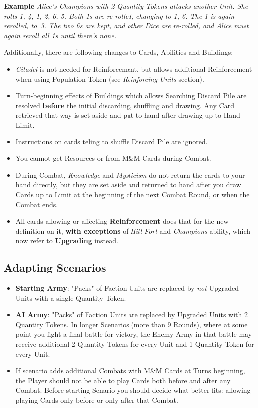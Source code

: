 \begin{multicols*}{2}
    \textbf{Example} \textit{Alice's Champions with 2 Quantity Tokens attacks another Unit. She rolls 1, 4, 1, 2, 6, 5. Both 1s are re-rolled, changing to 1, 6. The 1 is again rerolled, to~3. The two 6s are kept, and other Dice are re-rolled, and Alice must again reroll all 1s until there's none.}
    
    Additionally, there are following changes to Cards, Abilities and Buildings:
    \begin{itemize}
        \item \textit{Citadel} is not needed for Reinforcement, but allows additional Reinforcement when using Population Token (see \textit{Reinforcing Units} section).
        \item Turn-beginning effects of Buildings which allows Searching Discard Pile are resolved \textbf{before} the initial discarding, shuffling and drawing. Any Card retrieved that way is set aside and put to hand after drawing up to Hand Limit.
        \item Instructions on cards teling to shuffle Discard Pile are ignored.
        \item You cannot get Resources or  from M\&M Cards during Combat.
        \item During Combat, \textit{Knowledge} and \textit{Mysticism} do not return the cards to your hand directly, but they are set aside and returned to hand after you draw Cards up to Limit at the beginning of the next Combat Round, or when the Combat ends.
        \item All cards allowing or affecting \textbf{Reinforcement} does that for the new definition on it, \textbf{with exceptions} of \textit{Hill Fort} and \textit{Champions} ability, which now refer to \textbf{Upgrading} instead.
    \end{itemize}
    
    \subsection*{Adapting Scenarios}
    
    \begin{itemize}
        \item \textbf{Starting Army}: "Packs" of Faction Units are replaced by \textit{not} Upgraded Units with a single Quantity Token.
        \item \textbf{AI Army}: "Packs" of Faction Units are replaced by Upgraded Units with 2 Quantity Tokens. In longer Scenarios (more than 9 Rounds), where at some point you fight a final battle for victory, the Enemy Army in that battle may receive additional 2 Quantity Tokens for every  Unit and 1 Quantity Token for every  Unit.
        \item If scenario adds additional Combats with M\&M Cards at Turns beginning, the Player should not be able to play Cards both before and after any Combat. Before starting Senario you should decide what better fits: allowing playing Cards only before or only after that Combat.
    \end{itemize}
        
\end{multicols*}
